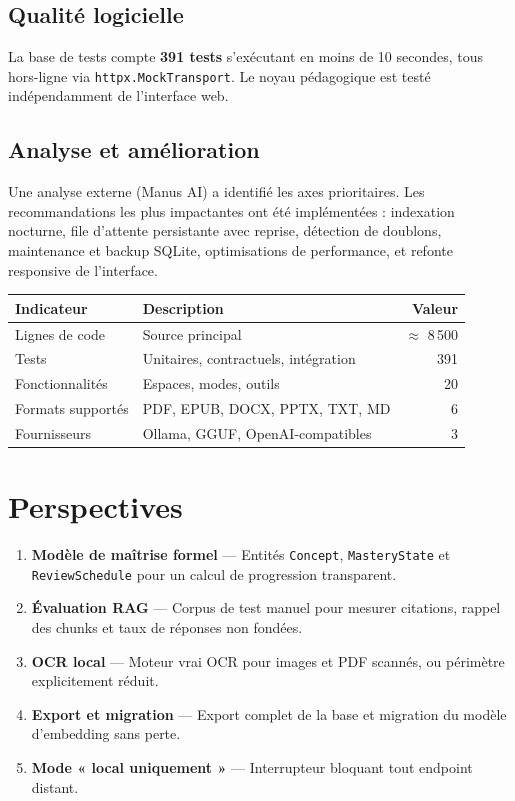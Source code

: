 \documentclass[11pt,a4paper]{article}
\begin{document}
\subsection{Qualité logicielle}

La base de tests compte \textbf{391 tests} s'exécutant en moins de 10 secondes, tous hors-ligne via \texttt{httpx.MockTransport}. Le noyau pédagogique est testé indépendamment de l'interface web.

\subsection{Analyse et amélioration}

Une analyse externe (Manus AI) a identifié les axes prioritaires. Les recommandations les plus impactantes ont été implémentées : indexation nocturne, file d'attente persistante avec reprise, détection de doublons, maintenance et backup SQLite, optimisations de performance, et refonte responsive de l'interface.

\begin{center}
\begin{tabularx}{0.85\textwidth}{l X r}
\toprule
\textbf{Indicateur} & \textbf{Description} & \textbf{Valeur} \\
\midrule
Lignes de code & Source principal & $\approx$ 8\,500 \\
Tests & Unitaires, contractuels, intégration & 391 \\
Fonctionnalités & Espaces, modes, outils & 20 \\
Formats supportés & PDF, EPUB, DOCX, PPTX, TXT, MD & 6 \\
Fournisseurs & Ollama, GGUF, OpenAI-compatibles & 3 \\
\bottomrule
\end{tabularx}
\end{center}

\section{Perspectives}

\begin{enumerate}
    \item \textbf{Modèle de maîtrise formel} --- Entités \texttt{Concept}, \texttt{MasteryState} et \texttt{ReviewSchedule} pour un calcul de progression transparent.
    \item \textbf{Évaluation RAG} --- Corpus de test manuel pour mesurer citations, rappel des chunks et taux de réponses non fondées.
    \item \textbf{OCR local} --- Moteur vrai OCR pour images et PDF scannés, ou périmètre explicitement réduit.
    \item \textbf{Export et migration} --- Export complet de la base et migration du modèle d'embedding sans perte.
    \item \textbf{Mode « local uniquement »} --- Interrupteur bloquant tout endpoint distant.
\end{enumerate}
\end{document}
